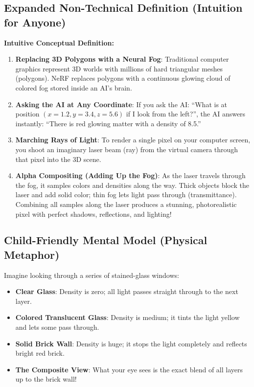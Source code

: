 \documentclass[11pt,a4paper]{article}
\theoremstyle{definition}
\begin{document}
\subsection{Expanded Non-Technical Definition (Intuition for Anyone)}
\textbf{Intuitive Conceptual Definition:}
\begin{enumerate}
    \item \textbf{Replacing 3D Polygons with a Neural Fog}: Traditional computer graphics represent 3D worlds with millions of hard triangular meshes (polygons). NeRF replaces polygons with a continuous glowing cloud of colored fog stored inside an AI's brain.
    \item \textbf{Asking the AI at Any Coordinate}: If you ask the AI: ``What is at position $(x=1.2, y=3.4, z=5.6)$ if I look from the left?'', the AI answers instantly: ``There is red glowing matter with a density of 8.5.''
    \item \textbf{Marching Rays of Light}: To render a single pixel on your computer screen, you shoot an imaginary laser beam (ray) from the virtual camera through that pixel into the 3D scene.
    \item \textbf{Alpha Compositing (Adding Up the Fog)}: As the laser travels through the fog, it samples colors and densities along the way. Thick objects block the laser and add solid color; thin fog lets light pass through (transmittance). Combining all samples along the laser produces a stunning, photorealistic pixel with perfect shadows, reflections, and lighting!
\end{enumerate}

\subsection{Child-Friendly Mental Model (Physical Metaphor)}
Imagine looking through a series of stained-glass windows:
\begin{itemize}
    \item \textbf{Clear Glass}: Density is zero; all light passes straight through to the next layer.
    \item \textbf{Colored Translucent Glass}: Density is medium; it tints the light yellow and lets some pass through.
    \item \textbf{Solid Brick Wall}: Density is huge; it stops the light completely and reflects bright red brick.
    \item \textbf{The Composite View}: What your eye sees is the exact blend of all layers up to the brick wall!
\end{itemize}
\end{document}
